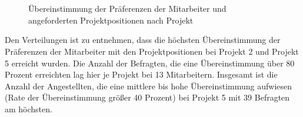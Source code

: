 \begin{figure}[H]
    \\
    \\
\caption[Übereinstimmung der Präferenzen der Mitarbeiter und angeforderten Projektpositionen nach Projekt]{Übereinstimmung der Präferenzen der Mitarbeiter und angeforderten Projektpositionen nach Projekt}
  \label{fig:ergebnisse:abb4}
\end{figure}
Den Verteilungen ist zu entnehmen, dass die höchsten Übereinstimmung der Präferenzen der Mitarbeiter mit den Projektpositionen bei Projekt 2 und Projekt 5 erreicht wurden.
Die Anzahl der Befragten, die eine Übereinstimmung über 80 Prozent erreichten lag hier je Projekt bei 13 Mitarbeitern.
Insgesamt ist die Anzahl der Angestellten, die eine mittlere bis hohe Übereinstimmung aufwiesen (Rate der Übereinstimmung größer 40 Prozent) bei Projekt 5 mit 39 Befragten am höchsten.

